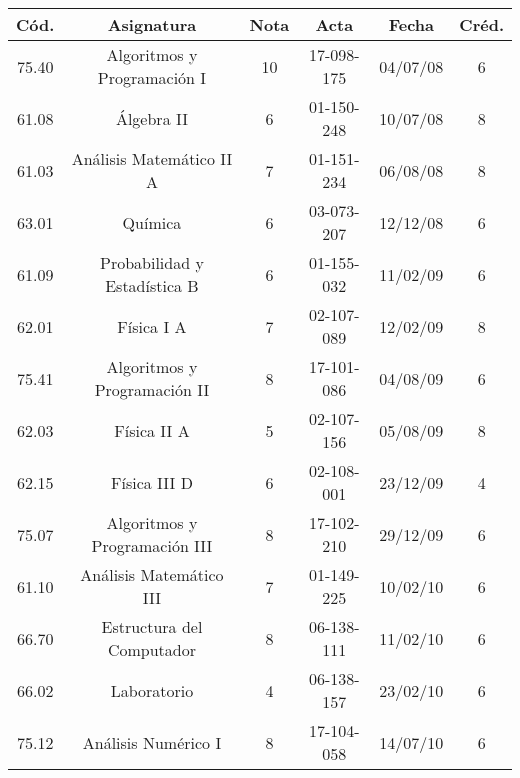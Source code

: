     \small{
        \begin{center}
        \hspace*{-1cm}
        \begin{tabular}{|c|c|c|c|c|c|}
            \hline
            \textbf{Cód.} & \textbf{Asignatura} & \textbf{Nota} & \textbf{Acta} & \textbf{Fecha} & \textbf{Créd.} \\ 
            \hline
            75.40 & Algoritmos y Programación I                & 10 & 17-098-175 & 04/07/08 & 6 \\
            \hline
            61.08 & Álgebra II                                 & 6  & 01-150-248 & 10/07/08 & 8 \\
            \hline
            61.03 & Análisis Matemático II A                   & 7  & 01-151-234 & 06/08/08 & 8 \\
            \hline
            63.01 & Química                                    & 6  & 03-073-207 & 12/12/08 & 6 \\
            \hline
            61.09 & Probabilidad y Estadística B               & 6  & 01-155-032 & 11/02/09 & 6 \\
            \hline
            62.01 & Física I A                                 & 7  & 02-107-089 & 12/02/09 & 8 \\
            \hline
            75.41 & Algoritmos y Programación II               & 8  & 17-101-086 & 04/08/09 & 6 \\
            \hline 
            62.03 & Física II A                                & 5  & 02-107-156 & 05/08/09 & 8 \\
            \hline
            62.15 & Física III D                               & 6  & 02-108-001 & 23/12/09 & 4 \\
            \hline
            75.07 & Algoritmos y Programación III              & 8  & 17-102-210 & 29/12/09 & 6 \\
            \hline
            61.10 & Análisis Matemático III                    & 7  & 01-149-225 & 10/02/10 & 6 \\
            \hline 
            66.70 & Estructura del Computador                  & 8  & 06-138-111 & 11/02/10 & 6 \\
            \hline
            66.02 & Laboratorio                                & 4  & 06-138-157 & 23/02/10 & 6 \\
            \hline
            75.12 & Análisis Numérico I                        & 8  & 17-104-058 & 14/07/10 & 6 \\

\end{tabular}
\end{center}}
